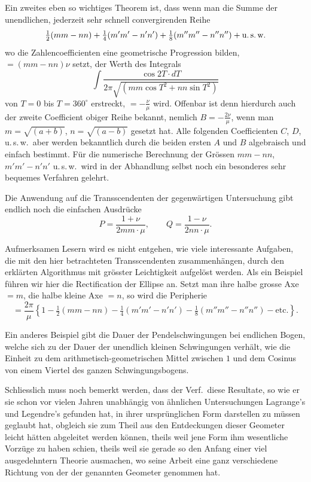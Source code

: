 \documentclass[12pt,a4paper]{article}
\begin{document}
Ein zweites eben so wichtiges Theorem ist, dass wenn man die Summe der unendlichen, jederzeit sehr schnell convergirenden Reihe
\[
\tfrac{1}{2}(mm-nn) + \tfrac{1}{4}(m'm'-n'n') + \tfrac{1}{8}(m''m''-n''n'') + \text{u.\,s.\,w.}
\]
wo die Zahlencoefficienten eine geometrische Progression bilden, $=(mm-nn)\nu$ setzt, der Werth des Integrals
\[
\int\frac{\cos 2T\cdot dT}{2\pi\sqrt{(mm\cos T^2 + nn\sin T^2)}}
\]
von $T=0$ bis $T=360^{\circ}$ erstreckt, $=-\frac{\nu}{\mu}$ wird. Offenbar ist denn hierdurch auch der zweite Coefficient obiger Reihe bekannt, nemlich $B=-\frac{2\nu}{\mu}$, wenn man $m=\sqrt{(a+b)}$, $n=\sqrt{(a-b)}$ gesetzt hat. Alle folgenden Coefficienten $C$, $D$, u.\,s.\,w.\ aber werden bekanntlich durch die beiden ersten $A$ und $B$ algebraisch und einfach bestimmt. F\"ur die numerische Berechnung der Gr\"ossen $mm-nn$, $m'm'-n'n'$ u.\,s.\,w.\ wird in der Abhandlung selbst noch ein besonderes sehr bequemes Verfahren gelehrt.

Die Anwendung auf die Transscendenten der gegenw\"artigen Untersuchung gibt endlich noch die einfachen Ausdr\"ucke
\[
P = \frac{1+\nu}{2mm\cdot\mu}, \qquad Q = \frac{1-\nu}{2nn\cdot\mu}.
\]

Aufmerksamen Lesern wird es nicht entgehen, wie viele interessante Aufgaben, die mit den hier betrachteten Transscendenten zusammenh\"angen, durch den erkl\"arten Algorithmus mit gr\"osster Leichtigkeit aufgel\"ost werden. Als ein Beispiel f\"uhren wir hier die Rectification der Ellipse an. Setzt man ihre halbe grosse Axe $=m$, die halbe kleine Axe $=n$, so wird die Peripherie
\[
= \frac{2\pi}{\mu}\left\{1 - \tfrac{1}{2}(mm-nn) - \tfrac{1}{4}(m'm'-n'n') - \tfrac{1}{8}(m''m''-n''n'') - \text{etc.}\right\}.
\]

Ein anderes Beispiel gibt die Dauer der Pendelschwingungen bei endlichen Bogen, welche sich zu der Dauer der unendlich kleinen Schwingungen verh\"alt, wie die Einheit zu dem arithmetisch-geometrischen Mittel zwischen $1$ und dem Cosinus von einem Viertel des ganzen Schwingungsbogens.

Schliesslich muss noch bemerkt werden, dass der Verf.\ diese Resultate, so wie er sie schon vor vielen Jahren unabh\"angig von \"ahnlichen Untersuchungen Lagrange's und Legendre's gefunden hat, in ihrer urspr\"unglichen Form darstellen zu m\"ussen geglaubt hat, obgleich sie zum Theil aus den Entdeckungen dieser Geometer leicht h\"atten abgeleitet werden k\"onnen, theils weil jene Form ihm wesentliche Vorz\"uge zu haben schien, theils weil sie gerade so den Anfang einer viel ausgedehntern Theorie ausmachen, wo seine Arbeit eine ganz verschiedene Richtung von der der genannten Geometer genommen hat.
\end{document}
